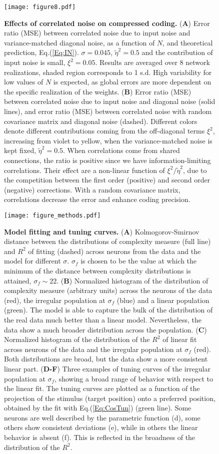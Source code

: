 \documentclass[a4paper]{article}%
\begin{document}
\begin{figure}[ptb]
\centering
\texttt{[image: figure8.pdf]}\caption{\textbf{Effects of
correlated noise on compressed coding.} (\textbf{A}) Error ratio (MSE) between
correlated noise due to input noise and variance-matched diagonal noise, as a function of $N$, and theoretical prediction, Eq.(\ref{Eq:IN}).
$\sigma=0.045$, $\tilde\eta^{2} = 0.5$ and the contribution of
input noise is small, $\xi^{2} = 0.05$. Results are averaged over 8 network realizations, shaded region corresponds to 
1 s.d. High variability for low values of $N$ is expected, as global errors are more dependent on the specific realization of the weights.  (\textbf{B}) Error ratio (MSE)
between correlated noise due to input noise and diagonal noise (solid lines),
and error ratio (MSE) between correlated noise with random covariance matrix and
diagonal noise (dashed). Different colors denote different contributions
coming from the off-diagonal terms $\xi^{2}$, increasing from violet to
yellow, when the variance-matched noise is kept fixed, $\tilde\eta^{2} =
0.5$. When correlations come from shared connections, the ratio is positive
since we have information-limiting correlations. Their effect are a non-linear
function of $\xi^{2}/\tilde\eta^{2}$, due to the competition between
the first order (positive) and second order (negative) corrections. With a
random covariance matrix, correlations decrease the error and enhance coding precision.}
\label{Fig:8}
\end{figure}
\clearpage
\begin{figure}[ptb]
\centering
\texttt{[image: figure\_methods.pdf]}\caption{ \textbf{Model
fitting and tuning curves.} (\textbf{A}) Kolmogorov-Smirnov distance between
the distributions of complexity measure (full line) and $R^{2}$ of fitting
(dashed) across neurons from the data and the model for different $\sigma$.
$\sigma_{f}$ is chosen to be the value at which the minimum of the distance
between complexity distributions is attained, $\sigma_{f}\sim22$. (\textbf{B})
Normalized histogram of the distribution of complexity measure (arbitrary
units) across the neurons of the data (red), the irregular population at
$\sigma_{f}$ (blue) and a linear population (green). The model is able to
capture the bulk of the distribution of the real data much better than a
linear model. Nevertheless, the data show a much broader distribution across
the population. (\textbf{C}) Normalized histogram of the distribution of the
$R^{2}$ of linear fit across neurons of the data and the irregular population
at $\sigma_{f}$ (red). Both distributions are broad, but the data show a more
consistent linear part. (\textbf{D-F}) Three examples of tuning curves of the
irregular population at $\sigma_{f}$, showing a broad range of behavior with
respect to the linear fit. The tuning curves are plotted as a  function of the
projection of the stimulus (target position) onto a preferred position,
obtained by the fit with Eq.(\ref{Eq:CosTun}) (green line). Some neurons are
well described by the parametric function (d), some others show consistent
deviations (e), while in others the linear behavior is absent (f). This is
reflected in the broadness of the distribution of the $R^{2}$. }
\label{Fig:M1}
\end{figure}
%

\end{document}
